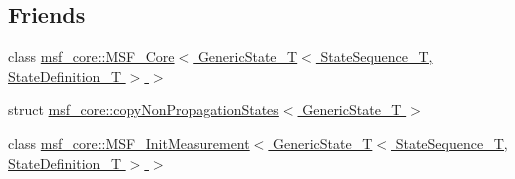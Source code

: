 \subsection*{Friends}
\begin{DoxyCompactItemize}
\item 
class \hyperlink{structmsf__core_1_1GenericState__T_af712399c37091d0c5b71a0dbe27cf4ae}{msf\-\_\-core\-::\-M\-S\-F\-\_\-\-Core$<$ Generic\-State\-\_\-\-T$<$ State\-Sequence\-\_\-\-T, State\-Definition\-\_\-\-T $>$ $>$}
\item 
struct \hyperlink{structmsf__core_1_1GenericState__T_a8a2e95cafb3556e7b1e658353f6cd74e}{msf\-\_\-core\-::copy\-Non\-Propagation\-States$<$ Generic\-State\-\_\-\-T $>$}
\item 
class \hyperlink{structmsf__core_1_1GenericState__T_aa5650f4d3b3f29f901872e699b9e6398}{msf\-\_\-core\-::\-M\-S\-F\-\_\-\-Init\-Measurement$<$ Generic\-State\-\_\-\-T$<$ State\-Sequence\-\_\-\-T, State\-Definition\-\_\-\-T $>$ $>$}
\end{DoxyCompactItemize}


